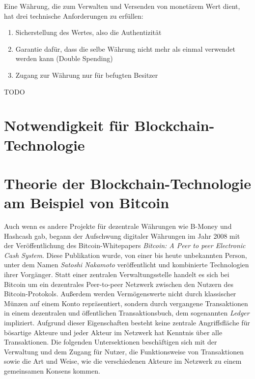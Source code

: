Eine Währung, die zum Verwalten und Versenden von monetärem Wert dient, hat drei technische Anforderungen zu erfüllen:
\begin{enumerate}
	\item Sicherstellung des Wertes, also die Authentizität
	\item Garantie dafür, dass die selbe Währung nicht mehr als einmal verwendet werden kann (Double Spending)
	\item Zugang zur Währung nur für befugten Besitzer
\end{enumerate}
TODO
\section{Notwendigkeit für Blockchain-Technologie}
\section{Theorie der Blockchain-Technologie am Beispiel von Bitcoin}
Auch wenn es andere Projekte für dezentrale Währungen wie B-Money und Hashcash gab, begann der Aufschwung digitaler Währungen im Jahr 2008 mit der Veröffentlichung des Bitcoin-Whitepapers \emph{Bitcoin: A Peer to peer Electronic Cash System}. Diese Publikation wurde, von einer bis heute unbekannten Person, unter dem Namen \emph{Satoshi Nakamoto} veröffentlicht und kombinierte Technologien ihrer Vorgänger. Statt einer zentralen Verwaltungsstelle handelt es sich bei Bitcoin um ein dezentrales Peer-to-peer Netzwerk zwischen den Nutzern des Bitcoin-Protokols. Außerdem werden Vermögenswerte nicht durch klassischer Münzen auf einem Konto repräsentiert, sondern durch vergangene Transaktionen in einem dezentralen und öffentlichen Transaktionsbuch, dem sogenannten \emph{Ledger} impliziert. Aufgrund dieser Eigenschaften besteht keine zentrale Angriffsfläche für bösartige Akteure und jeder Akteur im Netzwerk hat Kenntnis über alle Transaktionen. Die folgenden Untersektionen beschäftigen sich mit der Verwaltung und dem Zugang für Nutzer, die Funktionsweise von Transaktionen sowie die Art und Weise, wie die verschiedenen Akteure im Netzwerk zu einem gemeinsamen Konsens kommen.
